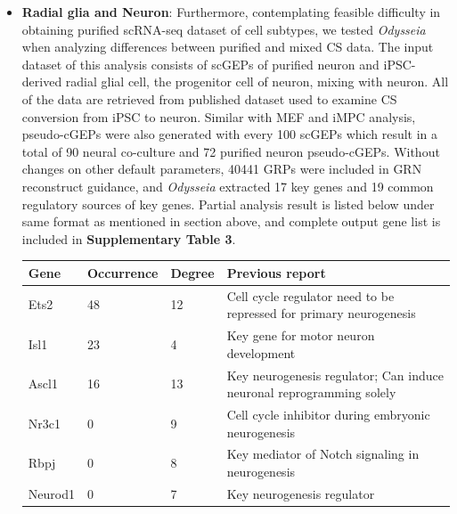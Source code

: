 \documentclass[fleqn,10pt]{wlscirep}
\begin{document}
\begin{itemize}
\item \textbf{Radial glia and Neuron}:
Furthermore, contemplating feasible difficulty in obtaining purified scRNA-seq dataset of cell subtypes, we tested \emph{Odysseia} when analyzing differences between purified and mixed CS data.
The input dataset of this analysis consists of scGEPs of purified neuron and iPSC-derived radial glial cell, the progenitor cell of neuron, mixing with neuron.
All of the data are retrieved from published dataset used to examine CS conversion from iPSC to neuron.\cite{ips_neuron_ascl1}
Similar with MEF and iMPC analysis, pseudo-cGEPs were also generated with every 100 scGEPs which result in a total of 90 neural co-culture and 72 purified neuron pseudo-cGEPs.
Without changes on other default parameters, 40441 GRPs were included in GRN reconstruct guidance, and \emph{Odysseia} extracted 17 key genes and 19 common regulatory sources of key genes.
Partial analysis result is listed below under same format as mentioned in section above, and complete output gene list is included in \textbf{Supplementary Table 3}.

\begin{table}[ht]
\centering
\begin{tabular}{|l|l|l|l|}
\hline
\textbf{Gene} & \textbf{Occurrence} & \textbf{Degree} & \textbf{Previous report}  \\
\hline
Ets2 & 48 & 12 & Cell cycle regulator need to be repressed for primary neurogenesis\cite{ets2_1, ets2_2} \\
\hline
Isl1 & 23 & 4 & Key gene for motor neuron development\cite{isl1_1, isl1_2011, isl1_repro}\\
\hline
Ascl1 & 16 & 13 & Key neurogenesis regulator\cite{ips_neuron_ascl1, ascl1_1}; Can induce neuronal reprogramming solely\cite{ascl1_1frepro ,ascl1_repro} \\
\hline
Nr3c1 & 0 & 9 & Cell cycle inhibitor during embryonic neurogenesis\cite{nr3c1}\\
\hline
Rbpj & 0 & 8 & Key mediator of Notch signaling in neurogenesis\cite{rbpj_1, rbpj_2, rbpj_3}\\
\hline
Neurod1 & 0 & 7 & Key neurogenesis regulator\cite{ips_neuron_ascl1, neurod1_1, neurod1_2, neurod1_3, neurod1_4} \\
\hline
\end{tabular}
\end{table}

\end{itemize}
\end{document}
